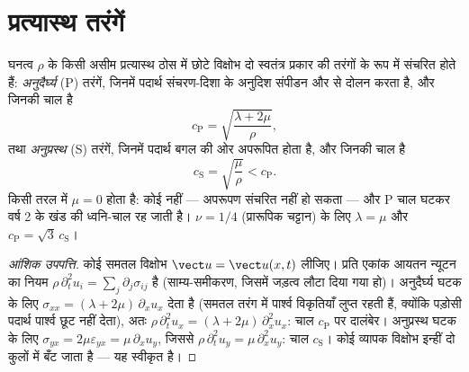 \section{प्रत्यास्थ तरंगें}

\begin{proposition}[किसी ठोस की दो आवाज़ें]\label{prop:b3:continuum-elasticity:waves}
घनत्व $\rho$ के किसी असीम प्रत्यास्थ ठोस में छोटे विक्षोभ दो स्वतंत्र
प्रकार की तरंगों के रूप में संचरित होते हैं:
\emph{अनुदैर्घ्य} (P) तरंगें, जिनमें पदार्थ संचरण-दिशा के अनुदिश
संपीडन और  से दोलन करता है, और जिनकी चाल है
\[
c_{\text{P}} = \sqrt{\frac{\lambda + 2\mu}{\rho}} ,
\]
तथा \emph{अनुप्रस्थ} (S) तरंगें, जिनमें पदार्थ बगल की ओर अपरूपित होता है, और जिनकी चाल है
\[
c_{\text{S}} = \sqrt{\frac{\mu}{\rho}} < c_{\text{P}} .
\]
किसी तरल में $\mu = 0$ होता है: कोई  नहीं --- अपरूपण संचरित नहीं
हो सकता --- और P चाल घटकर वर्ष 2 के खंड की ध्वनि-चाल रह जाती है।
$\nu = 1/4$ (प्रारूपिक चट्टान) के लिए $\lambda = \mu$ और $c_{\text{P}} =
\sqrt3\,c_{\text{S}}$।
\end{proposition}

\begin{proof}[आंशिक उपपत्ति]
कोई समतल विक्षोभ $\vect u = \vect u(x, t)$ लीजिए। प्रति एकांक आयतन
न्यूटन का नियम $\rho\,\partial_t^2u_i = \sum_j\partial_j\sigma_{ij}$ है
(साम्य-समीकरण, जिसमें जड़त्व लौटा दिया गया हो)। अनुदैर्घ्य
घटक के लिए  $\sigma_{xx} = (\lambda +
2\mu)\,\partial_xu_x$ देता है (समतल तरंग में पार्श्व विकृतियाँ लुप्त
रहती हैं, क्योंकि पड़ोसी पदार्थ पार्श्व छूट नहीं देता), अतः
$\rho\,\partial_t^2u_x = (\lambda + 2\mu)\,\partial_x^2u_x$: चाल
$c_{\text{P}}$ पर दालंबेर। अनुप्रस्थ घटक के लिए $\sigma_{yx} =
2\mu\varepsilon_{yx} = \mu\,\partial_xu_y$, जिससे
$\rho\,\partial_t^2u_y = \mu\,\partial_x^2u_y$: चाल $c_{\text{S}}$।
कोई व्यापक विक्षोभ इन्हीं दो कुलों में बँट जाता है --- यह स्वीकृत है।
\end{proof}


